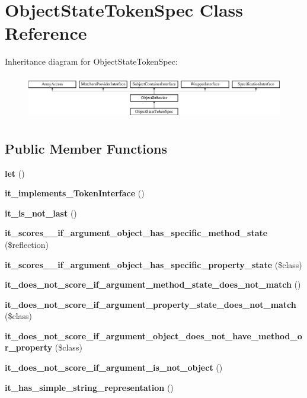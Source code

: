 \section{Object\+State\+Token\+Spec Class Reference}
\label{classspec_1_1_prophecy_1_1_argument_1_1_token_1_1_object_state_token_spec}
Inheritance diagram for Object\+State\+Token\+Spec\+:\begin{figure}[H]
\begin{center}
\leavevmode
\includegraphics[height=1.953488cm]{classspec_1_1_prophecy_1_1_argument_1_1_token_1_1_object_state_token_spec}
\end{center}
\end{figure}
\subsection*{Public Member Functions}
\begin{DoxyCompactItemize}
\item 
{\bf let} ()
\item 
{\bf it\+\_\+implements\+\_\+\+Token\+Interface} ()
\item 
{\bf it\+\_\+is\+\_\+not\+\_\+last} ()
\item 
{\bf it\+\_\+scores\+\_\+\_\+if\+\_\+argument\+\_\+object\+\_\+has\+\_\+specific\+\_\+method\+\_\+state} (\$reflection)
\item 
{\bf it\+\_\+scores\+\_\+\_\+if\+\_\+argument\+\_\+object\+\_\+has\+\_\+specific\+\_\+property\+\_\+state} (\$class)
\item 
{\bf it\+\_\+does\+\_\+not\+\_\+score\+\_\+if\+\_\+argument\+\_\+method\+\_\+state\+\_\+does\+\_\+not\+\_\+match} ()
\item 
{\bf it\+\_\+does\+\_\+not\+\_\+score\+\_\+if\+\_\+argument\+\_\+property\+\_\+state\+\_\+does\+\_\+not\+\_\+match} (\$class)
\item 
{\bf it\+\_\+does\+\_\+not\+\_\+score\+\_\+if\+\_\+argument\+\_\+object\+\_\+does\+\_\+not\+\_\+have\+\_\+method\+\_\+or\+\_\+property} (\$class)
\item 
{\bf it\+\_\+does\+\_\+not\+\_\+score\+\_\+if\+\_\+argument\+\_\+is\+\_\+not\+\_\+object} ()
\item 
{\bf it\+\_\+has\+\_\+simple\+\_\+string\+\_\+representation} ()
\end{DoxyCompactItemize}
